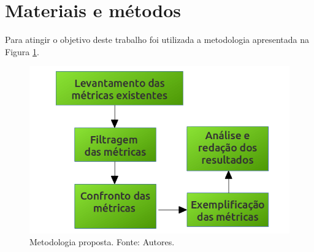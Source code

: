 \documentclass[conference]{IEEEtran}
\begin{document}
\section{Materiais e métodos}

Para atingir o objetivo deste trabalho foi utilizada a metodologia apresentada na Figura \ref{metodologia}.

\begin{figure}[ht]
  \centering
  \includegraphics[width=.3\textwidth]{figuras/metodologia.png}
  \caption{Metodologia proposta. Fonte: Autores.}
  \label{metodologia}
\end{figure}
\end{document}
